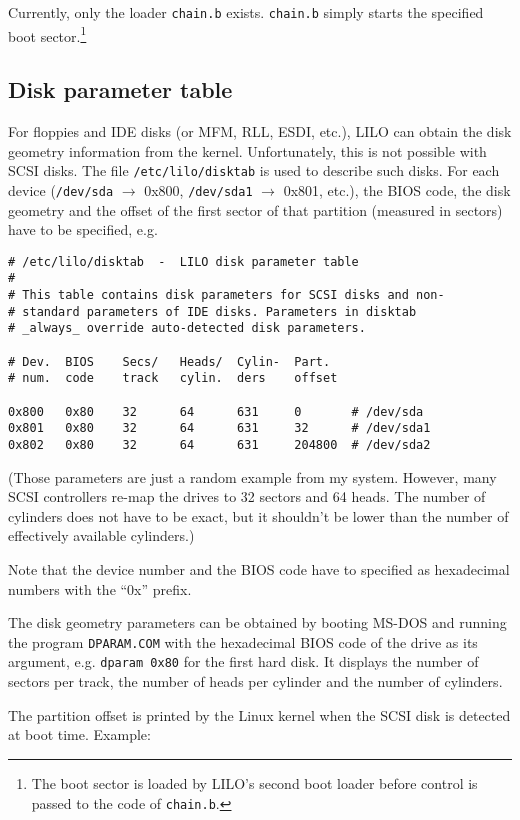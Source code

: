 Currently, only the loader {\tt chain.b} exists. {\tt chain.b} simply
starts the specified boot sector.\footnote{The boot sector is loaded by
LILO's second boot loader before control is passed to the code of
{\tt chain.b}.}


\subsection{Disk parameter table}
\label{disktab}

For floppies and IDE disks (or MFM, RLL, ESDI, etc.), LILO can obtain the
disk geometry information from the kernel. Unfortunately, this is not
possible with SCSI disks. The file {\tt /etc/lilo/disktab} is used to describe
such disks. For each device ({\tt /dev/sda} $\rightarrow$ 0x800,
{\tt /dev/sda1} $\rightarrow$ 0x801, etc.),
the BIOS code, the disk geometry and the offset of the first sector of
that partition (measured in sectors) have to be specified, e.g.

\begin{verbatim}
# /etc/lilo/disktab  -  LILO disk parameter table
#
# This table contains disk parameters for SCSI disks and non-
# standard parameters of IDE disks. Parameters in disktab
# _always_ override auto-detected disk parameters.

# Dev.  BIOS    Secs/   Heads/  Cylin-  Part.
# num.  code    track   cylin.  ders    offset

0x800   0x80    32      64      631     0       # /dev/sda
0x801   0x80    32      64      631     32      # /dev/sda1
0x802   0x80    32      64      631     204800  # /dev/sda2
\end{verbatim}

(Those parameters are just a random example from my system. However, many
SCSI controllers
re-map the drives to 32 sectors and 64 heads. The number of cylinders
does not have to be exact, but it shouldn't be lower than the number of
effectively available cylinders.)

Note that the device number and the BIOS code have to specified as
hexadecimal numbers with the ``0x'' prefix.

The disk geometry parameters can be obtained by booting MS-DOS and
running the program {\tt DPARAM.COM} with the hexadecimal BIOS code of
the drive as its argument, e.g. \verb"dparam 0x80" for the first hard
disk. It displays the number of sectors per
track, the number of heads per cylinder and the number of cylinders.

The partition offset is printed by the Linux kernel when the SCSI disk
is detected at boot time. Example:

